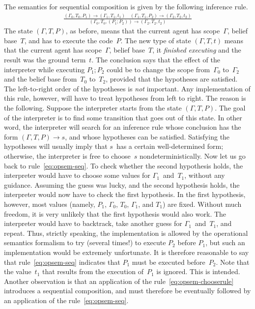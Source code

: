 \documentclass[a4paper,12pt,oneside,fleqn]{book} %
\begin{document}
The semantics for sequential composition is given by the following
inference rule.
\begin{align}
\frac
  {(\Gamma_0,T_0,P_1)\to(\Gamma_1,T_1,t_1)
  \quad
  (\Gamma_1,T_1,P_2)\to(\Gamma_2,T_2,t_2)}
  {(\Gamma_0,T_0,(P_1;P_2))\to(\Gamma_2,T_2,t_2)}
  \label{eq:opsem-seq}
\end{align}
The state $(\Gamma,T,P)$, as before, means that the current agent has
scope~$\Gamma$, belief base~$T$, and has to execute the code~$P$. The new
type of state $(\Gamma,T,t)$ means that the current agent has
scope~$\Gamma$, belief base~$T$, it \emph{finished executing} and the
result was the ground term~$t$.  The conclusion says that the effect of the
interpreter while executing $P_1;P_2$ could be to change the scope
from~$\Gamma_0$ to~$\Gamma_2$ and the belief base from~$T_0$ to~$T_2$,
provided that the hypotheses are satisfied. The left-to-right order of the
hypotheses is \emph{not} important. Any implementation of this rule,
however, will have to treat hypotheses from left to right. The reason is
the following. Suppose the interpreter starts from the state
$(\Gamma,T,P)$. The goal of the interpreter is to find some transition that
goes out of this state. In other word, the interpreter will search for an
inference rule whose conclusion has the form $(\Gamma,T,P)\to s$, and whose
hypotheses can be satisfied.  Satisfying the hypotheses will usually imply
that $s$~has a certain well-determined form; otherwise, the interpreter is
free to choose~$s$ nondeterministically. Now let us go back to
rule~\eqref{eq:opsem-seq}. To check whether the second hypothesis holds,
the interpreter would have to choose some values for $\Gamma_1$~and~$T_1$,
without any guidance.  Assuming the guess was lucky, and the second
hypothesis holds, the interpreter would now have to check the first
hypothesis. In the first hypothesis, however, most values (namely, $P_1$,
$\Gamma_0$, $T_0$, $\Gamma_1$, and $T_1$) are fixed. Without much freedom,
it is very unlikely that the first hypothesis would also work. The
interpreter would have to backtrack, take another guess for
$\Gamma_1$~and~$T_1$, and repeat. Thus, strictly speaking, the
implementation is allowed by the operational semantics formalism to try
(several times!) to execute $P_2$ before $P_1$, but such an implementation
would be extremely unfortunate. It is therefore reasonable to say that
rule~\eqref{eq:opsem-seq} indicates that $P_1$ must be executed
before~$P_2$. Note that the value~$t_1$ that results from the execution
of~$P_1$ is ignored. This is intended. Another observation is that an
application of the rule~\eqref{eq:opsem-chooserule} introduces a sequential
composition, and must therefore be eventually followed by an application of
the rule~\eqref{eq:opsem-seq}.
\end{document}
